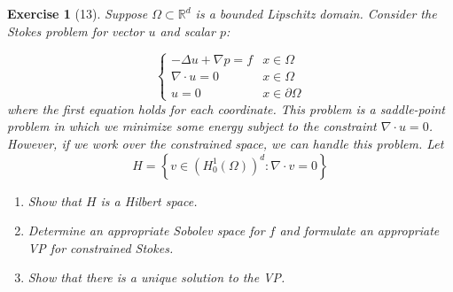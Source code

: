\documentclass[letterpaper,twoside,11pt]{article}
\theoremstyle{mystyle}
\newtheorem*{exercise}{Exercise}
\newcommand{\R}{{\mathbb R}}
\begin{document}
\begin{exercise}[13]
Suppose $\Omega\subset \R^d$ is a bounded Lipschitz domain. Consider the Stokes problem for vector $u$ and scalar $p$: 

\[\left\{ 
\begin{array}{*{20}{rl}}
- \Delta u + \nabla p = f  & x \in \Omega \\[.2cm] 
\nabla \cdot u = 0 & x \in \Omega \\[.2cm] 
u = 0 & x \in \partial \Omega  
\end{array}
\right. \]
where the first equation holds for each coordinate. This problem is a saddle-point problem in which we minimize some energy subject to the constraint $\nabla \cdot u = 0$. However, if we work over the constrained space, we can handle this problem. Let 
\[H = \left\{ v \in \left( H_0^1 (\Omega) \right)^d  : \nabla \cdot v = 0\right\}\]
\begin{enumerate}
  \item Show that $H$ is a Hilbert space. 
  \item Determine an appropriate Sobolev space for $f$ and formulate an appropriate VP for constrained Stokes. 
  \item Show that there is a unique solution to the VP. 
\end{enumerate}
\end{exercise}
\end{document}
